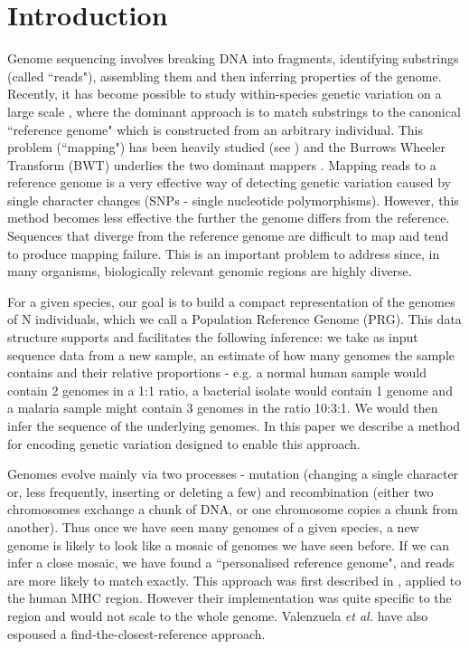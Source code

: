 \documentclass[runningheads,a4paper]{llncs}
\begin{document}
\section{Introduction}

Genome sequencing involves breaking DNA into fragments, identifying substrings (called ``reads"), assembling them and then inferring properties of the genome. Recently, it has become possible to study within-species genetic variation on a large scale \cite{1000g,arabi}, where the dominant approach is to match substrings to the canonical ``reference genome" which is constructed from an arbitrary individual. This problem (``mapping") has been heavily studied (see \cite{reinert}) and the Burrows Wheeler Transform (BWT) \cite{bwt} underlies the two dominant mappers \cite{bwa,bowtie}. Mapping reads to a reference genome is a very effective way of detecting genetic variation caused by single character changes (SNPs - single nucleotide polymorphisms). However, this method becomes less effective the further the genome differs from the reference. Sequences that diverge from the reference genome are difficult to map and tend to produce mapping failure. This is an important problem to address since, in many organisms, biologically relevant genomic regions are highly diverse. 

For a given species, our goal is to build a compact representation of the genomes of N individuals, which we call a Population Reference Genome (PRG). This data structure supports and facilitates the following inference: we take as input sequence data from a new sample, an estimate of how many genomes the sample contains and their relative proportions - e.g. a normal human sample would contain 2 genomes in a 1:1 ratio, a bacterial isolate would contain 1 genome and a malaria sample might contain 3 genomes in the ratio 10:3:1. We would then infer the sequence of the underlying genomes. In this paper we describe a method for encoding genetic variation designed to enable this approach. 

Genomes evolve mainly via two processes - mutation (changing a single character or, less frequently, inserting or deleting a few) and recombination (either two chromosomes exchange a chunk of DNA, or one chromosome copies a chunk from another). Thus once we have seen many genomes of a given species, a new genome is likely to look like a mosaic of genomes we have seen before. If we can infer a close mosaic, we have found a ``personalised reference genome", and reads are more likely to match exactly. This approach was first described in \cite{dilthey}, applied to the human MHC region. However their implementation was quite specific to the region and would not scale to the whole genome. Valenzuela \textit{et al.} \cite{valen} have  also espoused a find-the-closest-reference approach.
\end{document}

